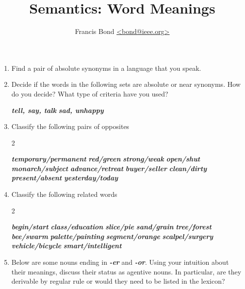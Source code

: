 \documentclass[a4paper]{article}
\title{Semantics: Word Meanings}
\author{Francis Bond \url{<bond@ieee.org>}}
\date{}%
\newcommand{\lex}[1]{\textbf{\textit{#1}}}
\begin{document}
\maketitle

\begin{enumerate}
  \item Find a pair of absolute synonyms in a language that you speak.  

  \item Decide if the words in the following sets are absolute or 
near synonyms. How do you decide? What
type of criteria have you used?
\begin{exe}
  \ex \lex{tell, say, talk} 
  \ex \lex{sad, unhappy} 
\end{exe}

\item  Classify the following pairs of opposites
\begin{multicols}{2}
\begin{exe}
  \ex \lex{temporary/permanent} 
  \ex \lex{red/green} 
  \ex \lex{strong/weak} 
  \ex \lex{open/shut} 
  \ex \lex{monarch/subject} 
  \ex \lex{advance/retreat} 
  \ex \lex{buyer/seller} 
  \ex \lex{clean/dirty} 
  \ex \lex{present/absent} 
  \ex \lex{yesterday/today} 
\end{exe}
\end{multicols}

\item  Classify the following related words
\begin{multicols}{2}
\begin{exe}
  \ex \lex{begin/start} 
  \ex \lex{class/education} 
  \ex \lex{slice/pie} 
  \ex \lex{sand/grain} 
  \ex \lex{tree/forest} 
  \ex \lex{bee/swarm} 
  \ex \lex{palette/painting} 
  \ex \lex{segment/orange} 
  \ex \lex{scalpel/surgery} 
  \ex \lex{vehicle/bicycle} 
  \ex \lex{smart/intelligent} 
\end{exe}
\end{multicols}


\item  Below are some nouns ending in \lex{-er} and \lex{-or}. Using your intuition
about their meanings, discuss their status as agentive nouns. In
particular, are they derivable by regular rule or would they need to
be listed in the lexicon?  


\end{enumerate}
\end{document}

